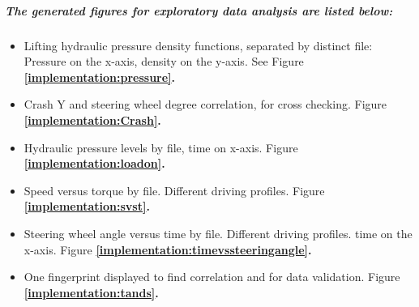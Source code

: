 		\subparagraph{The generated figures for exploratory data analysis are listed below:}
		\begin{itemize}
			\item{Lifting hydraulic pressure density functions, separated by distinct file:} Pressure on the x-axis, density on the y-axis. See Figure \textbf{\ref{implementation:pressure}.}
			\item{Crash Y and steering wheel degree correlation, for cross checking. Figure \textbf{\ref{implementation:Crash}.}}
			\item{Hydraulic pressure levels by file, time on x-axis. Figure \textbf{\ref{implementation:loadon}.}}
			\item{Speed versus torque by file. Different driving profiles. Figure \textbf{\ref{implementation:svst}.}}
			\item{Steering wheel angle versus time by file. Different driving profiles. time on the x-axis. Figure \textbf{\ref{implementation:timevssteeringangle}.}}
			\item{One fingerprint displayed to find correlation and for data validation. Figure \textbf{\ref{implementation:tands}.}}
		\end{itemize}

